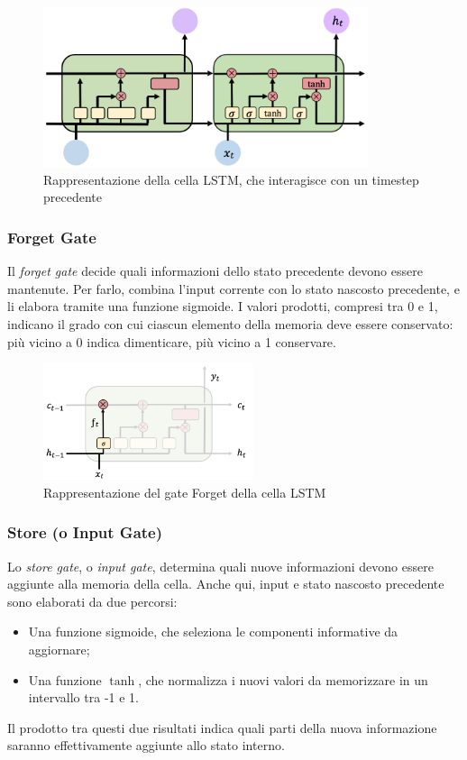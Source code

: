 \begin{figure}
    \centering
    \includegraphics[width=0.85\textwidth]{figure/LSTMSchema.png}
    \caption{Rappresentazione della cella LSTM, che interagisce con un timestep precedente}
    \label{fig:LSTMSchema}
\end{figure}

\subsubsection{Forget Gate}
Il \textit{forget gate} decide quali informazioni dello stato precedente devono essere mantenute. Per farlo, combina l'input corrente con lo stato nascosto precedente, e li elabora tramite una funzione sigmoide. I valori prodotti, compresi tra 0 e 1, indicano il grado con cui ciascun elemento della memoria deve essere conservato: più vicino a 0 indica dimenticare, più vicino a 1 conservare.

\begin{figure}[!ht]
    \centering
    \includegraphics[width=0.55\textwidth]{figure/ForgetLSTM.png}
    \caption{Rappresentazione del gate Forget della cella LSTM}
    \label{fig:LSTMForget}
\end{figure}

\subsubsection{Store (o Input Gate)}
Lo \textit{store gate}, o \textit{input gate}, determina quali nuove informazioni devono essere aggiunte alla memoria della cella. Anche qui, input e stato nascosto precedente sono elaborati da due percorsi:
\begin{itemize}
    \item Una funzione sigmoide, che seleziona le componenti informative da aggiornare;
    \item Una funzione $\tanh$, che normalizza i nuovi valori da memorizzare in un intervallo tra -1 e 1.
\end{itemize}
Il prodotto tra questi due risultati indica quali parti della nuova informazione saranno effettivamente aggiunte allo stato interno.

